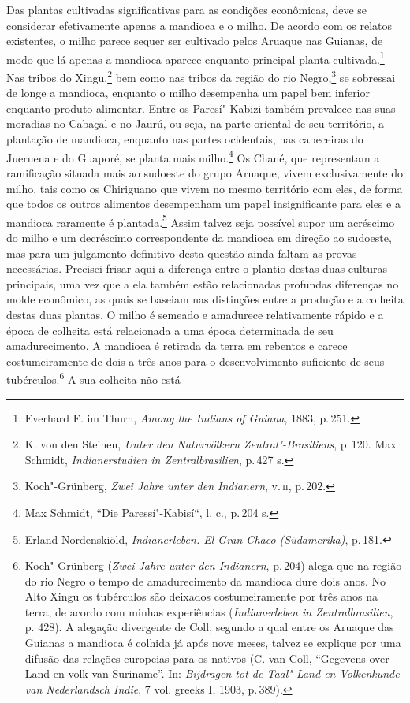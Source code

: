 Das plantas cultivadas significativas para as condições econômicas, deve
se considerar efetivamente apenas a mandioca e o milho. De acordo com
os relatos existentes, o milho parece sequer ser cultivado pelos Aruaque
nas Guianas, de modo que lá apenas a mandioca aparece enquanto principal
planta cultivada.\footnote{Everhard F. im Thurn, \textit{Among the Indians
  of Guiana}, 1883, p.\,251.} Nas tribos do Xingu,\footnote{K. von den
  Steinen, \textit{Unter den Naturvölkern Zentral"-Brasiliens}, p.\,120. Max
  Schmidt, \textit{Indianerstudien in Zentralbrasilien}, p.\,427 s.} bem
como nas tribos da região do rio Negro,\footnote{Koch"-Grünberg,
  \textit{Zwei Jahre unter den Indianern}, v.\,\textsc{ii}, p.\,202.} se sobressai
de longe a mandioca, enquanto o milho desempenha um papel bem inferior
enquanto produto alimentar. Entre os Paresí"-Kabizi também prevalece nas
suas moradias no Cabaçal e no Jaurú, ou seja, na parte oriental de seu
território, a plantação de mandioca, enquanto nas partes ocidentais, nas
cabeceiras do Jueruena e do Guaporé, se planta mais milho.\footnote{Max
  Schmidt, ``Die Paressí"-Kabisí``, l. c., p.\,204 s.} Os Chané, que
representam a ramificação situada mais ao sudoeste do grupo Aruaque,
vivem exclusivamente do milho, tais como os Chiriguano que vivem no
mesmo território com eles, de forma que todos os outros alimentos
desempenham um papel insignificante para eles e a mandioca raramente é
plantada.\footnote{Erland Nordenskiöld, \textit{Indianerleben. El Gran
  Chaco (Südamerika)}, p.\,181.} Assim talvez seja possível supor um
acréscimo do milho e um decréscimo correspondente da mandioca em direção
ao sudoeste, mas para um julgamento definitivo desta questão ainda
faltam as provas necessárias. Precisei frisar aqui a diferença entre o
plantio destas duas culturas principais, uma vez que a ela também estão
relacionadas profundas diferenças no molde econômico, as quais se
baseiam nas distinções entre a produção e a colheita destas duas
plantas. O milho é semeado e amadurece relativamente rápido e a época de
colheita está relacionada a uma época determinada de seu amadurecimento.
A mandioca é retirada da terra em rebentos e carece costumeiramente de
dois a três anos para o desenvolvimento suficiente de seus
tubérculos.\footnote{Koch"-Grünberg (\textit{Zwei Jahre unter den
  Indianern}, p.\,204) alega que na região do rio Negro o tempo de
  amadurecimento da mandioca dure dois anos. No Alto Xingu os tubérculos
  são deixados costumeiramente por três anos na terra, de acordo com
  minhas experiências (\textit{Indianerleben in Zentralbrasilien}, p.
  428). A alegação divergente de Coll, segundo a qual entre os Aruaque
  das Guianas a mandioca é colhida já após nove meses, talvez se
  explique por uma difusão das relações europeias para os nativos (C.
  van Coll, ``Gegevens over Land en volk van Suriname''. In:
  \textit{Bijdragen tot de Taal"-Land en Volkenkunde van Nederlandsch
  Indie}, 7 vol. greeks I, 1903, p.\,389).} A sua colheita não está
